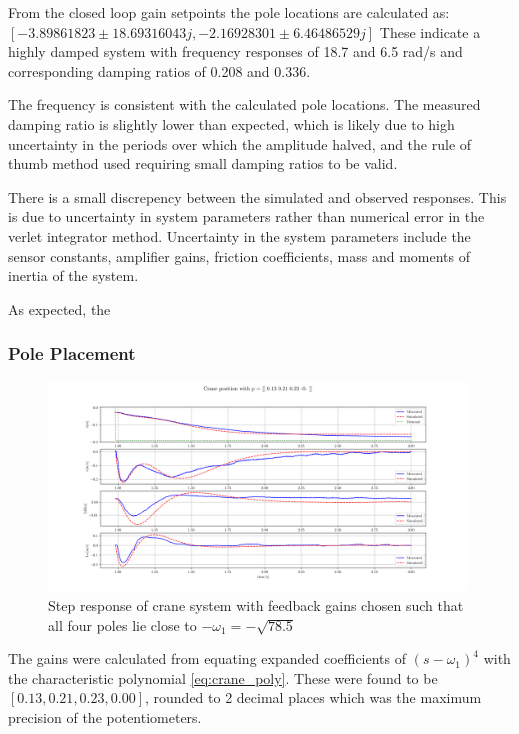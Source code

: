 \documentclass{article}
\begin{document}
From the closed loop gain setpoints the pole locations are calculated as: \\
$[-3.89861823 \pm 18.69316043j, -2.16928301 \pm 6.46486529j]$
These indicate a highly damped system with frequency responses of 18.7 and 6.5 rad/s and corresponding damping ratios of 0.208 and 0.336.

The frequency is consistent with the calculated pole locations. The measured damping ratio is slightly lower than expected, 
which is likely due to high uncertainty in the periods over which the amplitude halved, and the rule of thumb method used requiring small damping ratios to be valid.

There is a small discrepency between the simulated and observed responses. This is due to uncertainty in system parameters rather than numerical error in the verlet integrator method.
Uncertainty in the system parameters include the sensor constants, amplifier gains, friction coefficients, mass and moments of inertia of the system.

As expected, the 

\subsubsection{Pole Placement}

\begin{figure}[H]
  \centering
  \includegraphics[width=0.99\textwidth]{figures/3.4a.png}
  \caption{Step response of crane system with feedback gains chosen such that all four poles lie close to $-\omega_1 = -\sqrt{78.5}$}
  \label{fig:exp3.4a}
\end{figure}

The gains were calculated from equating expanded coefficients of $(s - \omega_1)^4$ with the characteristic polynomial \ref{eq:crane_poly}.
These were found to be $[ 0.13,  0.21,  0.23, 0.00 ]$, rounded to 2 decimal places which was the maximum precision of the potentiometers.
\end{document}
